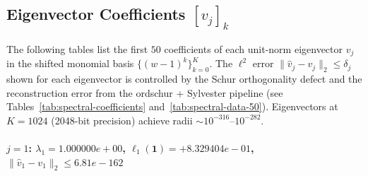 \documentclass[11pt]{article}
\begin{document}
\clearpage
\subsection*{Eigenvector Coefficients $[v_j]_k$}

The following tables list the first $50$ coefficients of each unit-norm
eigenvector $v_j$ in the shifted monomial basis $\{(w-1)^k\}_{k=0}^{K}$.
The $\ell^2$ error $\|\hat{v}_j - v_j\|_2 \leq \delta_j$ shown for each
eigenvector is controlled by the Schur orthogonality defect and the
reconstruction error from the ordschur + Sylvester pipeline
(see Tables~\ref{tab:spectral-coefficients} and~\ref{tab:spectral-data-50}).
Eigenvectors at $K = 1024$ (2048-bit precision) achieve radii $\sim 10^{-316}$--$10^{-282}$.

\paragraph{$j = 1$: $\lambda_{1} = 1.000000e+00$, \quad $\ell_{1}(\mathbf{1}) = +8.329404e-01$, \quad $\|\hat{v}_{1} - v_{1}\|_2 \leq 6.81e-162$}
\end{document}
